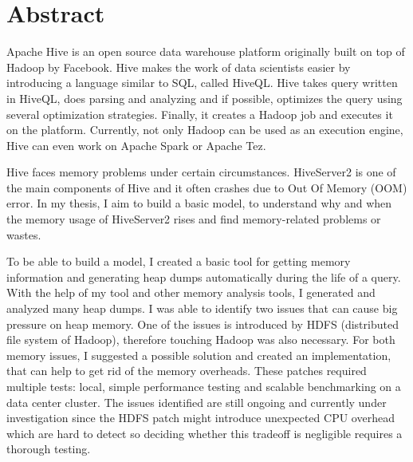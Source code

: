 \vfill
\selectenglish


\chapter*{Abstract}
Apache Hive is an open source data warehouse platform originally built on top of Hadoop by Facebook. Hive makes the work of data scientists easier by introducing a language similar to SQL, called HiveQL. Hive takes query written in HiveQL, does parsing and analyzing and if possible, optimizes the query using several optimization strategies. Finally, it creates a Hadoop job and executes it on the platform. Currently, not only Hadoop can be used as an execution engine, Hive can even work on Apache Spark or Apache Tez. 

Hive faces memory problems under certain circumstances. HiveServer2 is one of the main components of Hive and it often crashes due to Out Of Memory (OOM) error. In my thesis, I aim to build a basic model, to understand why and when the memory usage of HiveServer2 rises and find memory-related problems or wastes.

To be able to build a model, I created a basic tool for getting memory information and generating heap dumps automatically during the life of a query. With the help of my tool and other memory analysis tools, I generated and analyzed many heap dumps. I was able to identify two issues that can cause big pressure on heap memory. One of the issues is introduced by HDFS (distributed file system of Hadoop), therefore touching Hadoop was also necessary. For both memory issues, I suggested a possible solution and created an implementation, that can help to get rid of the memory overheads. These patches required multiple tests: local, simple performance testing and scalable benchmarking on a data center cluster. The issues identified are still ongoing and currently under investigation since the HDFS patch might introduce unexpected CPU overhead which are hard to detect so deciding whether this tradeoff is negligible requires a thorough testing. 

\vfill
\selectthesislanguage

\setcounter{romanPage}{\value{page}}
